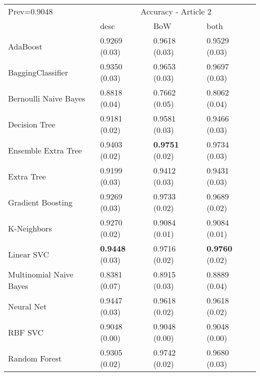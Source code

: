\begin{tabular}{|l|l|l|l| }
\hline
Prev=0.9048 &  \multicolumn{3}{c|}{Accuracy - Article 2} \\
\cline{2-4} & desc & BoW & both \\ \hline
AdaBoost                & 0.9269 (0.03) & 0.9618 (0.03) & 0.9529 (0.03)\\
BaggingClassifier       & 0.9350 (0.03) & 0.9653 (0.03) & 0.9697 (0.03)\\
Bernoulli Naive Bayes   & 0.8818 (0.04) & 0.7662 (0.05) & 0.8062 (0.04)\\
Decision Tree           & 0.9181 (0.02) & 0.9581 (0.03) & 0.9466 (0.03)\\
Ensemble Extra Tree     & 0.9403 (0.02) & {\bf 0.9751} (0.02) & 0.9734 (0.03)\\
Extra Tree              & 0.9199 (0.03) & 0.9412 (0.03) & 0.9431 (0.03)\\
Gradient Boosting       & 0.9269 (0.03) & 0.9733 (0.02) & 0.9689 (0.02)\\
K-Neighbors             & 0.9270 (0.02) & 0.9084 (0.01) & 0.9084 (0.01)\\
Linear SVC              & {\bf 0.9448} (0.03) & 0.9716 (0.02) & {\bf 0.9760} (0.02)\\
Multinomial Naive Bayes & 0.8381 (0.07) & 0.8915 (0.03) & 0.8889 (0.04)\\
Neural Net              & 0.9447 (0.03) & 0.9618 (0.02) & 0.9618 (0.02)\\
RBF SVC                 & 0.9048 (0.00) & 0.9048 (0.00) & 0.9048 (0.00)\\
Random Forest           & 0.9305 (0.02) & 0.9742 (0.02) & 0.9680 (0.03)\\
\hline
\end{tabular}